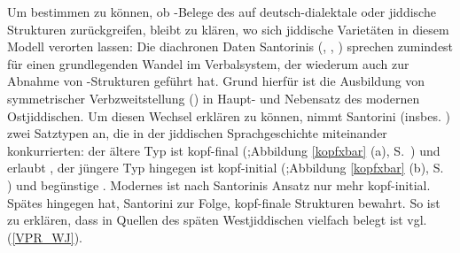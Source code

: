 Um bestimmen zu können, ob \hai{{\VPR}}-Belege des \hai{{\LiJi}} auf deutsch-dialektale oder jiddische Strukturen zurückgreifen, bleibt zu klären, wo sich jiddische Varietäten in diesem Modell verorten lassen: Die diachronen Daten Santorinis (\citeyear[126]{Santorini1989}, \citeyear[609]{Santorini1992}, \citeyear[278]{Santorini1993b,Santorini1995}) sprechen zumindest für einen grundlegenden Wandel im Verbalsystem, der wiederum auch zur Abnahme von \hai{{\VPR}}-Strukturen geführt hat. Grund hierfür ist die Ausbildung von symmetrischer Verbzweitstellung () in Haupt- und Nebensatz des modernen Ostjiddischen. Um diesen Wechsel erklären zu können, nimmt Santorini (insbes. \citeyear{Santorini1995}) zwei Satztypen an, die in der jiddischen Sprachgeschichte miteinander konkurrierten: der ältere Typ ist kopf-final (\hai{{\OV}};Abbildung \ref{kopfxbar} (a), S.\, \pageref{kopfxbar}) und erlaubt \hai{{\VPR}}, der jüngere Typ  hingegen ist kopf-initial (\hai{{\VO}};Abbildung \ref{kopfxbar} (b), S.\, \pageref{kopfxbar}) und begünstige . Modernes  ist nach Santorinis Ansatz nur mehr kopf-initial. Spätes  hingegen hat, Santorini zur Folge, kopf-finale Strukturen bewahrt. So ist zu erklären, dass in Quellen des späten Westjiddischen \hai{{\VPR}} vielfach belegt ist vgl.\, (\ref{VPR_WJ}).  
  
  


